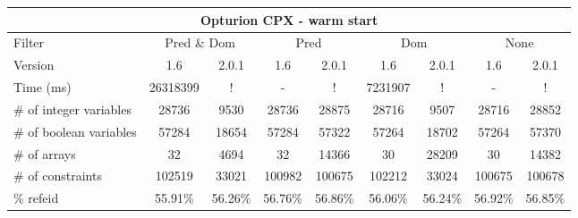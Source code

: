 \documentclass{standalone}
\begin{document}
\begin{tabular}{lc|c|c|c|c|c|c|c}
\multicolumn{9}{c}{Opturion CPX - warm start} \\ 
\hline\hline Filter & \multicolumn{2}{c|}{Pred \& Dom} &\multicolumn{2}{c|}{Pred}  & \multicolumn{2}{c|}{Dom} & \multicolumn{2}{c}{None} \\ 
\hline Version & 1.6 & 2.0.1 & 1.6 & 2.0.1 & 1.6 & 2.0.1 & 1.6 & 2.0.1 \\ 
Time (ms)               & 26318399 & !       & -       & !       & 7231907 & !       & -       & !       \\ 
\# of integer variables & 28736    & 9530    & 28736   & 28875   & 28716   & 9507    & 28716   & 28852	  \\ 
\# of boolean variables & 57284    & 18654   & 57284   & 57322   & 57264   & 18702   & 57264   & 57370	  \\ 
\# of arrays            & 32       & 4694    & 32      & 14366   & 30      & 28209   & 30      & 14382	  \\ 
\# of constraints       & 102519   & 33021   & 100982  & 100675  & 102212  & 33024   & 100675  & 100678  \\ 
\% refeid               & 55.91\%  & 56.26\% & 56.76\% & 56.86\% & 56.06\% & 56.24\% & 56.92\% & 56.85\% \\ 
\end{tabular} 
\end{document}
